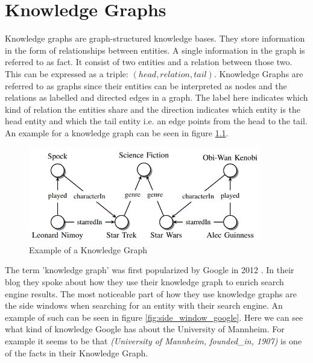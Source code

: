 \chapter{Knowledge Graphs}
\label{cha:knowledge_graphs}

Knowledge graphs are graph-structured knowledge bases. They store information in the form of relationships between entities. A single information in the graph is referred to as fact. It consist of two entities and a relation between those two. This can be expressed as a triple: $(head, relation, tail)$. Knowledge Graphs are referred to as graphs since their entities can be interpreted as nodes and the relations as labelled and directed edges in a graph. The label here indicates which kind of relation the entities share and the direction indicates which entity is the head entity and which the tail entity i.e. an edge points from the head to the tail. An example for a knowledge graph can be seen in figure \ref{fig:example_kg}. \cite{nickel_review_2015}

\begin{figure}[H]
\centering
\includegraphics[width=0.9\textwidth]{images/example_kg.png}
\caption{Example of a Knowledge Graph}
\label{fig:example_kg}
\end{figure}

The term 'knowledge graph' was first popularized by Google in 2012 \cite{singhal_introducing_2012}. In their blog they spoke about how they use their knowledge graph to enrich search engine results. The most noticeable part of how they use knowledge graphs are the side windows when searching for an entity with their search engine. An example of such can be seen in figure \ref{fig:side_window_google}. Here we can see what kind of knowledge Google has about the University of Mannheim. For example it seems to be that \textit{(University of Mannheim, founded\_in, 1907)} is one of the facts in their Knowledge Graph.

